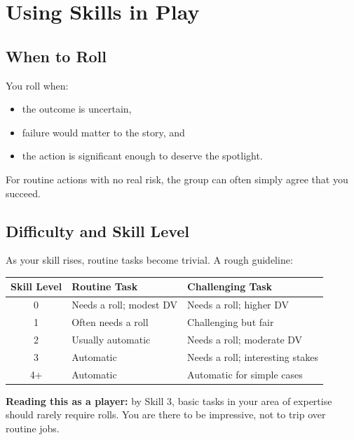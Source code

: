 \section{Using Skills in Play}
\label{sec:using-skills}

\subsection{When to Roll}
\label{sec:when-to-roll}
You roll when:
\begin{itemize}
  \item the outcome is uncertain,
  \item failure would matter to the story, and
  \item the action is significant enough to deserve the spotlight.
\end{itemize}
For routine actions with no real risk, the group can often simply agree that
you succeed.

\subsection{Difficulty and Skill Level}
\label{sec:difficulty-skill}
As your skill rises, routine tasks become trivial. A rough guideline:

\begin{center}
\begin{tabular}{cll}
\toprule
\textbf{Skill Level} & \textbf{Routine Task} & \textbf{Challenging Task} \\
\midrule
0 & Needs a roll; modest DV & Needs a roll; higher DV \\
1 & Often needs a roll & Challenging but fair \\
2 & Usually automatic & Needs a roll; moderate DV \\
3 & Automatic & Needs a roll; interesting stakes \\
4+ & Automatic & Automatic for simple cases \\
\bottomrule
\end{tabular}
\end{center}

\noindent\textbf{Reading this as a player:} by Skill 3, basic tasks in your area of
expertise should rarely require rolls. You are there to be impressive, not to
trip over routine jobs.

